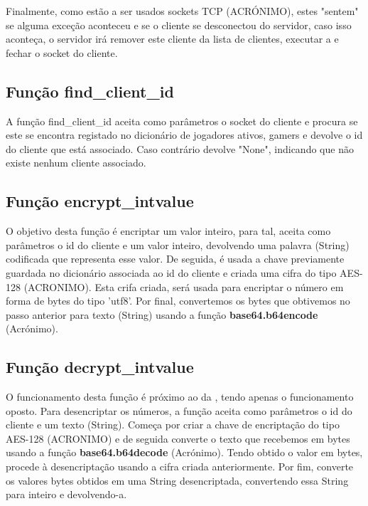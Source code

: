 \documentclass{report}
\begin{document}
Finalmente, como estão a ser usados sockets TCP (ACRÓNIMO), estes "sentem" se alguma exceção aconteceu e se o cliente se desconectou do servidor, caso isso aconteça, o servidor irá remover este cliente da lista de clientes, executar a  e fechar o socket do cliente.

\subsection{Função find\_client\_id}
\label{ssec:func_find_client_id}

A função find\_client\_id aceita como parâmetros o socket do cliente e procura se este se encontra registado no dicionário de jogadores ativos, gamers e devolve o id do cliente que está associado. Caso contrário devolve "None", indicando que não existe nenhum cliente associado.

\subsection{Função encrypt\_intvalue}
\label{ssec:func_encrypt_value_server}

O objetivo desta função é encriptar um valor inteiro, para tal, aceita como parâmetros o id do cliente e um valor inteiro, devolvendo uma palavra (String) codificada que representa esse valor. De seguida, é usada a chave previamente guardada no dicionário associada ao id do cliente e criada uma cifra do tipo AES-128 (ACRONIMO). Esta crifa criada, será usada para encriptar o número em forma de bytes do tipo 'utf8'. Por final, convertemos os bytes que obtivemos no passo anterior para texto (String) usando a função \textbf{base64.b64encode} (Acrónimo).

\subsection{Função decrypt\_intvalue}
\label{ssec:func_decrypt_value_server}

O funcionamento desta função é próximo ao da , tendo apenas o funcionamento oposto. Para desencriptar os números, a função aceita como parâmetros o id do cliente e um texto (String). Começa por criar a chave de encriptação do tipo AES-128 (ACRONIMO) e de seguida converte o texto que recebemos em bytes usando a função \textbf{base64.b64decode} (Acrónimo). Tendo obtido o valor em bytes, procede à desencriptação usando a cifra criada anteriormente. Por fim, converte os valores bytes obtidos em uma String desencriptada, convertendo essa String para inteiro e devolvendo-a.
\end{document}
